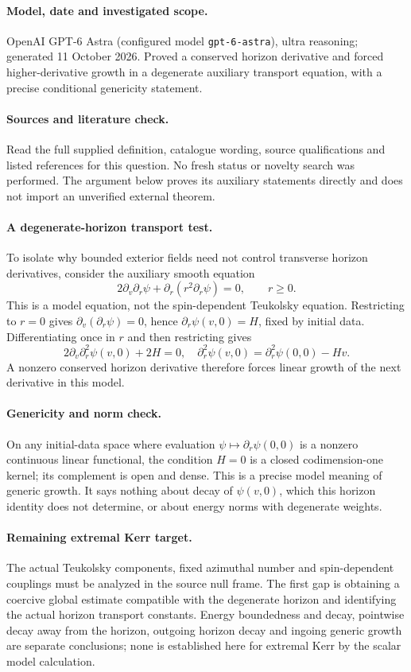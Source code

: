 \documentclass[11pt]{article}
\begin{document}
\paragraph{Model, date and investigated scope.}
OpenAI GPT-6 Astra (configured model \texttt{gpt-6-astra}), ultra reasoning; generated 11 October 2026. Proved a conserved horizon derivative and forced higher-derivative growth in a degenerate auxiliary transport equation, with a precise conditional genericity statement.

\paragraph{Sources and literature check.}
Read the full supplied definition, catalogue wording, source qualifications and listed references for this question. No fresh status or novelty search was performed. The argument below proves its auxiliary statements directly and does not import an unverified external theorem.

\paragraph{A degenerate-horizon transport test.} To isolate why bounded exterior fields need not control transverse horizon derivatives, consider the auxiliary smooth equation
\[
 2\partial_v\partial_r\psi+\partial_r(r^2\partial_r\psi)=0,
 \qquad r\geq0.
\]
This is a model equation, not the spin-dependent Teukolsky equation. Restricting to \(r=0\) gives \(\partial_v(\partial_r\psi)=0\), hence \(\partial_r\psi(v,0)=H\), fixed by initial data. Differentiating once in \(r\) and then restricting gives
\[
 2\partial_v\partial_r^2\psi(v,0)+2H=0,
 \quad \partial_r^2\psi(v,0)=\partial_r^2\psi(0,0)-Hv.
\]
A nonzero conserved horizon derivative therefore forces linear growth of the next derivative in this model.
\paragraph{Genericity and norm check.} On any initial-data space where evaluation \(\psi\mapsto\partial_r\psi(0,0)\) is a nonzero continuous linear functional, the condition \(H=0\) is a closed codimension-one kernel; its complement is open and dense. This is a precise model meaning of generic growth. It says nothing about decay of \(\psi(v,0)\), which this horizon identity does not determine, or about energy norms with degenerate weights.
\paragraph{Remaining extremal Kerr target.} The actual Teukolsky components, fixed azimuthal number and spin-dependent couplings must be analyzed in the source null frame. The first gap is obtaining a coercive global estimate compatible with the degenerate horizon and identifying the actual horizon transport constants. Energy boundedness and decay, pointwise decay away from the horizon, outgoing horizon decay and ingoing generic growth are separate conclusions; none is established here for extremal Kerr by the scalar model calculation.
\end{document}
